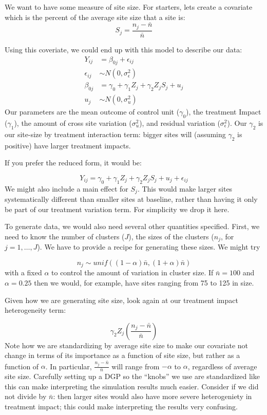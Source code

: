 \documentclass[
]{book}
\begin{document}
We want to have some measure of site size.
For starters, lets create a covariate which is the percent of the average site size that a site is:
\[ S_j = \frac{n_j - \bar{n}}{ \bar{n} } \]

Using this coveriate, we could end up with this model to describe our data:
\[
\begin{aligned}
Y_{ij} &= \beta_{0j} + \epsilon_{ij} \\
\epsilon_{ij} &\sim N( 0, \sigma^2_\epsilon ) \\
\beta_{0j} &= \gamma_{0} + \gamma_{1} Z_j + \gamma_2 Z_j S_j + u_j \\
u_j &\sim N( 0, \sigma^2_u )
\end{aligned}
\]
Our parameters are the mean outcome of control unit (\(\gamma_0\)), the treatment Impact (\(\gamma_1\)), the amount of cross site variation (\(\sigma^2_u\)), and residual variation (\(\sigma^2_\epsilon\)).
Our \(\gamma_2\) is our site-size by treatment interaction term: bigger sites will (assuming \(\gamma_2\) is positive) have larger treatment impacts.

If you prefer the reduced form, it would be:

\[ Y_{ij} = \gamma_{0} + \gamma_{1} Z_j + \gamma_2 Z_j S_j  + u_j + \epsilon_{ij}  \]
We might also include a main effect for \(S_j\).
This would make larger sites systematically different than smaller sites at baseline, rather than having it only be part of our treatment variation term.
For simplicity we drop it here.

To generate data, we would also need several other quantities specified.
First, we need to know the number of clusters (\(J\)), the sizes of the clusters (\(n_j\), for \(j = 1, \ldots, J\)).
We have to provide a recipe for generating these sizes. We might try

\[ n_j \sim unif( (1-\alpha)\bar{n}, (1+\alpha)\bar{n} ) \]
with a fixed \(\alpha\) to control the amount of variation in cluster size.
If \(\bar{n} = 100\) and \(\alpha = 0.25\) then we would, for example, have sites ranging from 75 to 125 in size.

Given how we are generating site size, look again at our treatment impact heterogeneity term:

\[ \gamma_2 Z_j \left(\frac{n_j - \bar{n}}{\bar{n}}\right)  \]
Note how we are standardizing by average site size to make our covariate not change in terms of its importance as a function of site size, but rather as a function of \(\alpha\).
In particular, \(\frac{n_j - \bar{n}}{\bar{n}}\) will range from \(-\alpha\) to \(\alpha\), regardless of average site size.
Carefully setting up a DGP so the ``knobs'' we use are standardized like this can make interpreting the simulation results much easier.
Consider if we did not divide by \(\bar{n}\): then larger sites would also have more severe heterogeniety in treatment impact; this could make interpreting the results very confusing.
\end{document}
